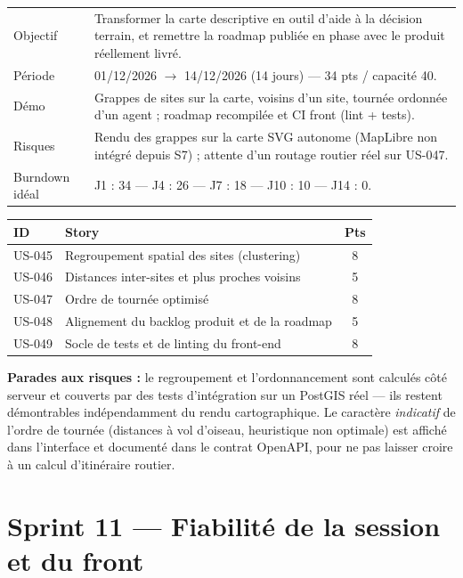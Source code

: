 \begin{center}
\begin{tabular}{lp{11cm}}
\toprule
Objectif  & Transformer la carte descriptive en outil d'aide à la décision
            terrain, et remettre la roadmap publiée en phase avec le produit
            réellement livré. \\
Période   & 01/12/2026 $\rightarrow$ 14/12/2026 (14 jours) --- 34 pts / capacité 40. \\
Démo      & Grappes de sites sur la carte, voisins d'un site, tournée ordonnée
            d'un agent ; roadmap recompilée et CI front (lint + tests). \\
Risques   & Rendu des grappes sur la carte SVG autonome (MapLibre non intégré
            depuis S7) ; attente d'un routage routier réel sur US-047. \\
Burndown idéal & J1 : 34 --- J4 : 26 --- J7 : 18 --- J10 : 10 --- J14 : 0. \\
\bottomrule
\end{tabular}
\end{center}

\begin{center}
\begin{tabular}{lp{9cm}c}
\toprule
\textbf{ID} & \textbf{Story} & \textbf{Pts} \\
\midrule
US-045 & Regroupement spatial des sites (clustering)      & 8 \\
US-046 & Distances inter-sites et plus proches voisins    & 5 \\
US-047 & Ordre de tournée optimisé                        & 8 \\
US-048 & Alignement du backlog produit et de la roadmap   & 5 \\
US-049 & Socle de tests et de linting du front-end        & 8 \\
\bottomrule
\end{tabular}
\end{center}

\textbf{Parades aux risques :} le regroupement et l'ordonnancement sont
calculés côté serveur et couverts par des tests d'intégration sur un PostGIS
réel --- ils restent démontrables indépendamment du rendu cartographique. Le
caractère \emph{indicatif} de l'ordre de tournée (distances à vol d'oiseau,
heuristique non optimale) est affiché dans l'interface et documenté dans le
contrat OpenAPI, pour ne pas laisser croire à un calcul d'itinéraire routier.

\section{Sprint 11 --- Fiabilité de la session et du front}

